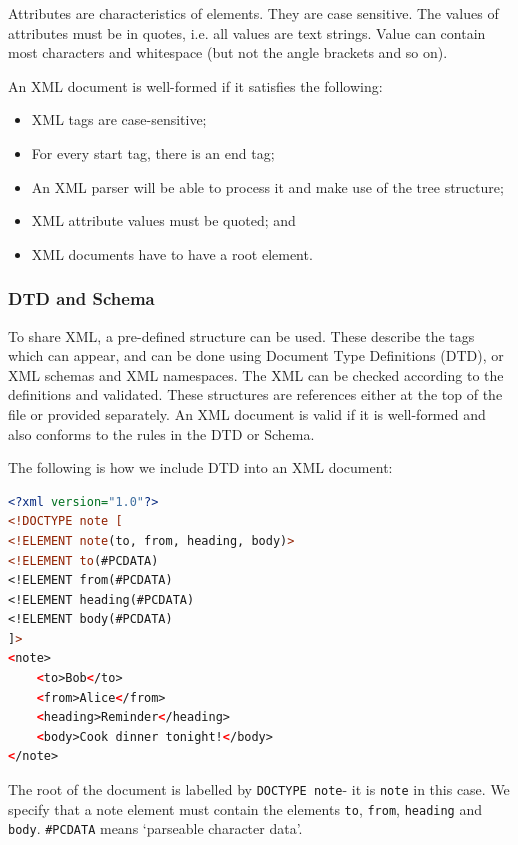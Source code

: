 \documentclass[a4paper, openany]{memoir}
\begin{document}
\noindent Attributes are characteristics of elements. They are case sensitive. The values of attributes must be in quotes, i.e. all values are text strings. Value can contain most characters and whitespace (but not the angle brackets and so on).

\noindent An XML document is well-formed if it satisfies the following:
\begin{itemize}
    \item XML tags are case-sensitive;
    \item For every start tag, there is an end tag;
    \item An XML parser will be able to process it and make use of the tree structure;
    \item XML attribute values must be quoted; and
    \item XML documents have to have a root element.
\end{itemize}

\subsubsection{DTD and Schema}
To share XML, a pre-defined structure can be used. These describe the tags which can appear, and can be done using Document Type Definitions (DTD), or XML schemas and XML namespaces. The XML can be checked according to the definitions and validated. These structures are references either at the top of the file or provided separately. An XML document is valid if it is well-formed and also conforms to the rules in the DTD or Schema.

\noindent The following is how we include DTD into an XML document:
\begin{lstlisting}[language=xml]
<?xml version="1.0"?>
<!DOCTYPE note [
<!ELEMENT note(to, from, heading, body)>
<!ELEMENT to(#PCDATA)
<!ELEMENT from(#PCDATA)
<!ELEMENT heading(#PCDATA)
<!ELEMENT body(#PCDATA)
]>
<note>
    <to>Bob</to>
    <from>Alice</from>
    <heading>Reminder</heading>
    <body>Cook dinner tonight!</body>
</note>
\end{lstlisting}
The root of the document is labelled by \texttt{DOCTYPE note}- it is \texttt{note} in this case. We specify that a note element must contain the elements \texttt{to}, \texttt{from}, \texttt{heading} and \texttt{body}. \texttt{\#PCDATA} means `parseable character data'.
\end{document}
